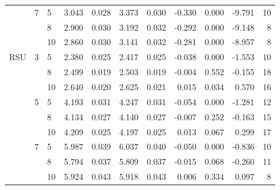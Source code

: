 \begin{tabular}{lllrrrrrrrr}
    & 7 & 5  &    3.043 &     0.028 &  3.373 &     0.030 &     -0.330 &   0.000 &    -9.791 &  10 \\
    &   & 8  &    2.900 &     0.030 &  3.192 &     0.032 &     -0.292 &   0.000 &    -9.148 &   8 \\
    &   & 10 &    2.860 &     0.030 &  3.141 &     0.032 &     -0.281 &   0.000 &    -8.957 &   8 \\
RSU & 3 & 5  &    2.380 &     0.025 &  2.417 &     0.025 &     -0.038 &   0.000 &    -1.553 &  10 \\
    &   & 8  &    2.499 &     0.019 &  2.503 &     0.019 &     -0.004 &   0.552 &    -0.155 &  18 \\
    &   & 10 &    2.640 &     0.020 &  2.625 &     0.021 &      0.015 &   0.034 &     0.570 &  16 \\
    & 5 & 5  &    4.193 &     0.031 &  4.247 &     0.031 &     -0.054 &   0.000 &    -1.281 &  12 \\
    &   & 8  &    4.134 &     0.027 &  4.140 &     0.027 &     -0.007 &   0.252 &    -0.163 &  15 \\
    &   & 10 &    4.209 &     0.025 &  4.197 &     0.025 &      0.013 &   0.067 &     0.299 &  17 \\
    & 7 & 5  &    5.987 &     0.039 &  6.037 &     0.040 &     -0.050 &   0.000 &    -0.836 &  10 \\
    &   & 8  &    5.794 &     0.037 &  5.809 &     0.037 &     -0.015 &   0.068 &    -0.260 &  11 \\
    &   & 10 &    5.924 &     0.043 &  5.918 &     0.043 &      0.006 &   0.334 &     0.097 &   8 \\
\bottomrule
\end{tabular}
